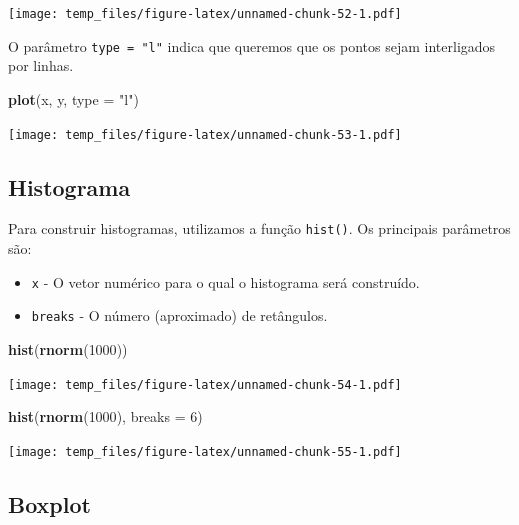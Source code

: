 \documentclass[
]{book}
\newenvironment{Shaded}{\begin{snugshade}}{\end{snugshade}}
\newcommand{\DataTypeTok}[1]{\textcolor[rgb]{0.13,0.29,0.53}{#1}}
\newcommand{\DecValTok}[1]{\textcolor[rgb]{0.00,0.00,0.81}{#1}}
\newcommand{\KeywordTok}[1]{\textcolor[rgb]{0.13,0.29,0.53}{\textbf{#1}}}
\newcommand{\NormalTok}[1]{#1}
\newcommand{\StringTok}[1]{\textcolor[rgb]{0.31,0.60,0.02}{#1}}
\providecommand{\tightlist}{%
  \setlength{\itemsep}{0pt}\setlength{\parskip}{0pt}}
\begin{document}
\texttt{[image: temp\_files/figure-latex/unnamed-chunk-52-1.pdf]}

O parâmetro \texttt{type\ =\ "l"} indica que queremos que os pontos sejam interligados por linhas.

\begin{Shaded}
\begin{Highlighting}[]
\KeywordTok{plot}\NormalTok{(x, y, }\DataTypeTok{type =} \StringTok{"l"}\NormalTok{)}
\end{Highlighting}
\end{Shaded}

\texttt{[image: temp\_files/figure-latex/unnamed-chunk-53-1.pdf]}

\hypertarget{histograma}{%
\subsection{Histograma}\label{histograma}}

Para construir histogramas, utilizamos a função \texttt{hist()}. Os principais parâmetros são:

\begin{itemize}
\tightlist
\item
  \texttt{x} - O vetor numérico para o qual o histograma será construído.
\item
  \texttt{breaks} - O número (aproximado) de retângulos.
\end{itemize}

\begin{Shaded}
\begin{Highlighting}[]
\KeywordTok{hist}\NormalTok{(}\KeywordTok{rnorm}\NormalTok{(}\DecValTok{1000}\NormalTok{))}
\end{Highlighting}
\end{Shaded}

\texttt{[image: temp\_files/figure-latex/unnamed-chunk-54-1.pdf]}

\begin{Shaded}
\begin{Highlighting}[]
\KeywordTok{hist}\NormalTok{(}\KeywordTok{rnorm}\NormalTok{(}\DecValTok{1000}\NormalTok{), }\DataTypeTok{breaks =} \DecValTok{6}\NormalTok{)}
\end{Highlighting}
\end{Shaded}

\texttt{[image: temp\_files/figure-latex/unnamed-chunk-55-1.pdf]}

\hypertarget{boxplot}{%
\subsection{Boxplot}\label{boxplot}}
\end{document}
